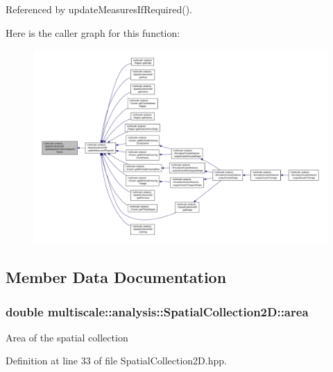 Referenced by update\-Measures\-If\-Required().



Here is the caller graph for this function\-:\nopagebreak
\begin{figure}[H]
\begin{center}
\leavevmode
\includegraphics[width=350pt]{classmultiscale_1_1analysis_1_1SpatialCollection2D_ad94bce09032b184ebfd5b5006217c683_icgraph}
\end{center}
\end{figure}




\subsection{Member Data Documentation}
\hypertarget{classmultiscale_1_1analysis_1_1SpatialCollection2D_ac570cc755e52aeb9deacf12d223a4a3a}{
\subsubsection[{area}]{\setlength{\rightskip}{0pt plus 5cm}double multiscale\-::analysis\-::\-Spatial\-Collection2\-D\-::area\hspace{0.3cm}{\ttfamily [protected]}}}\label{classmultiscale_1_1analysis_1_1SpatialCollection2D_ac570cc755e52aeb9deacf12d223a4a3a}
Area of the spatial collection 

Definition at line 33 of file Spatial\-Collection2\-D.\-hpp.



